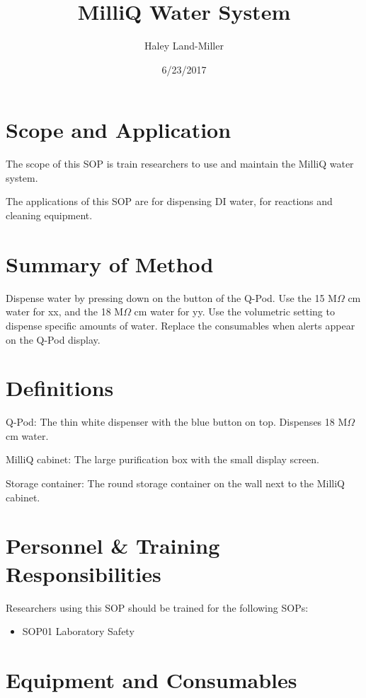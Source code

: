 \documentclass[12pt]{../SOP3_beta}\usepackage[]{graphicx}\usepackage[]{color}
\title{MilliQ Water System}
\date{6/23/2017}
\author{Haley Land-Miller}
\begin{document}
\maketitle

\section{Scope and Application}

\NP The scope of this SOP is train researchers to use and maintain the MilliQ water system.

\NP The applications of this SOP are for dispensing DI water, for reactions and cleaning equipment. 

\section{Summary of Method}

\NP Dispense water by pressing down on the button of the Q-Pod. Use the 15 M$\Omega$ cm water for xx, and the 18 M$\Omega$ cm water for yy. Use the volumetric setting to dispense specific amounts of water. Replace the consumables when alerts appear on the Q-Pod display. 

\tableofcontents

\newpage

\section{Definitions}

\NP Q-Pod: The thin white dispenser with the blue button on top. Dispenses 18 M$\Omega$ cm water. 

\NP MilliQ cabinet: The large purification box with the small display screen.

\NP Storage container: The round storage container on the wall next to the MilliQ cabinet.

\section{Personnel \& Training Responsibilities}

\NP Researchers using this SOP should be trained for the following SOPs:

\begin{itemize}
  \item SOP01 Laboratory Safety
\end{itemize}

\section{Equipment and Consumables}
\end{document}
